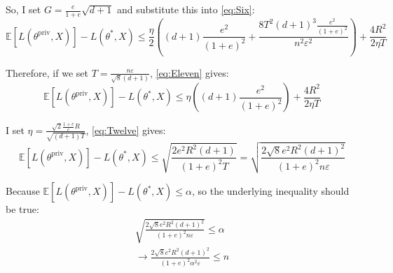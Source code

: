\documentclass[12pt]{extarticle}
\begin{document}
So, I set \(G = \frac{e}{1+e} \sqrt{d+1}\) and substitute this into \ref{eq:Six}:
\begin{equation}
	\mathbb{E}[L(\theta^\text{priv}, X)] -  L(\theta^{*}, X) \leq \frac{\eta}{2}( (d+1) \frac{e^2}{(1+e)^2} + \frac{8T^2(d+1)^3 \frac{e^2}{(1+e)^2}}{n^2\varepsilon^2}) + \frac{4R^2}{2\eta T}\label{eq:Eleven}
\end{equation}

Therefore, if we set \(T=\frac{n\varepsilon}{\sqrt{8}(d+1)}\), \ref{eq:Eleven} gives:
\begin{equation}
	\mathbb{E}[L(\theta^\text{priv}, X)] -  L(\theta^{*}, X) \leq  \eta ( (d+1) \frac{e^2}{(1+e)^2}) + \frac{4R^2}{2\eta T}\label{eq:Twelve}
\end{equation}

I set \(\eta = \frac{\sqrt{2}\frac{1+e}{e}R}{\sqrt{(d+1)T}}\), \ref{eq:Twelve} gives:
\begin{equation*}
	\mathbb{E}[L(\theta^\text{priv}, X)] -  L(\theta^{*}, X) \leq  \sqrt{\frac{2e^2R^2(d+1)}{(1+e)^2T}} = \sqrt{\frac{2\sqrt{8}e^2R^2(d+1)^2}{(1+e)^2n\varepsilon}}
\end{equation*}

Because \(\mathbb{E}[L(\theta^\text{priv}, X)] -  L(\theta^{*}, X)\leq \alpha\), so the underlying inequality should be true:
\begin{align*}
	\sqrt{\frac{2\sqrt{8}e^2R^2(d+1)^2}{(1+e)^2n\varepsilon}} \leq \alpha\\
	\rightarrow  \frac{2\sqrt{8}e^2R^2(d+1)^2}{(1+e)^2\alpha^2\varepsilon} \leq n	\label{eq:Thirteen}
\end{align*}
\end{document}
